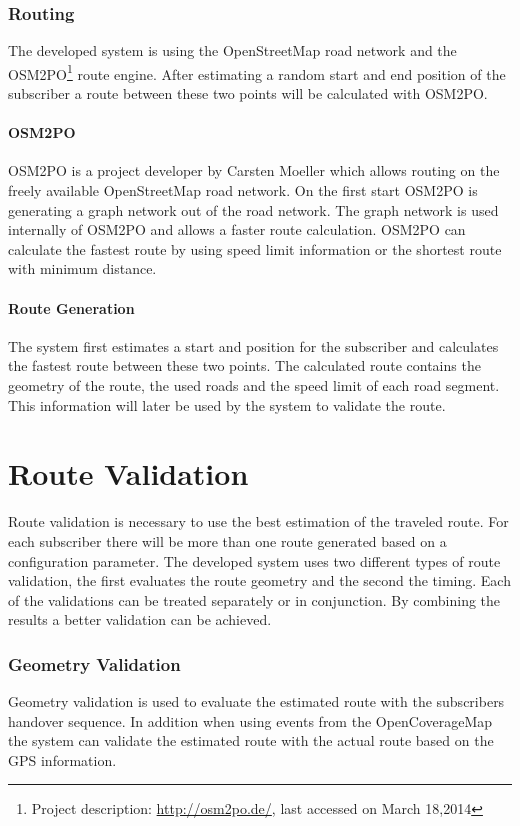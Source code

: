 \documentclass[master,english]{hgbthesis}
\begin{document}
\subsubsection{Routing}
The developed system is using the OpenStreetMap road network and the OSM2PO\footnote{Project description: \url{http://osm2po.de/}, last accessed on March 18,2014} route engine. After estimating a random start and end position of the subscriber a route between these two points will be calculated with OSM2PO.
\paragraph{OSM2PO}
OSM2PO is a project developer by Carsten Moeller which allows routing on the freely available OpenStreetMap road network. On the first start OSM2PO is generating a graph network out of the road network. The graph network is used internally of OSM2PO and allows a faster route calculation. OSM2PO can calculate the fastest route by using speed limit information or the shortest route with minimum distance.
\paragraph{Route Generation}
The system first estimates a start and position for the subscriber and calculates the fastest route between these two points. The calculated route contains the geometry of the route, the used roads and the speed limit of each road segment. This information will later be used by the system to validate the route.
\section{Route Validation}
\label{sec:routevalidation}
Route validation is necessary to use the best estimation of the traveled route. For each subscriber there will be more than one route generated based on a configuration parameter. The developed system uses two different types of route validation, the first evaluates the route geometry and the second the timing. Each of the validations can be treated separately or in conjunction. By combining the results a better validation can be achieved.
\subsubsection{Geometry Validation}
Geometry validation is used to evaluate the estimated route with the subscribers handover sequence. In addition when using events from the OpenCoverageMap the system can validate the estimated route with the actual route based on the GPS information.
\end{document}
